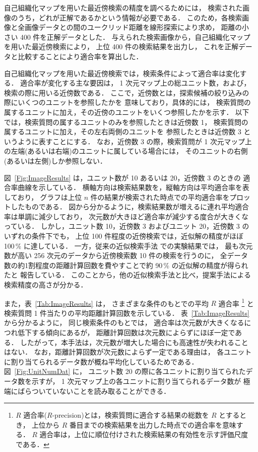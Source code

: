 自己組織化マップを用いた最近傍検索の精度を調べるためには，
検索された画像のうち，どれが正解であるかという情報が必要である．
このため，各検索画像と全画像データとの間のユークリッド距離を線形探索により求め，
距離の小さい 400 件を正解データとした．
与えられた検索画像から，自己組織化マップを用いた最近傍検索により，
上位 400 件の検索結果を出力し，
これを正解データと比較することにより適合率を算出した．

自己組織化マップを用いた最近傍検索では，検索条件によって適合率は変化する．
適合率が変化する主な要因は，
1 次元マップ上の総ユニット数，および，検索の際に用いる近傍数である．
ここで，近傍数とは，探索候補の絞り込みの際にいくつのユニットを参照したかを
意味しており，具体的には，
検索質問の属するユニットに加え，その近傍のユニットをいくつ参照したかを示す．
以下では，検索質問の属するユニットのみを参照したときは近傍数 1，
検索質問の属するユニットに加え，その左右両側のユニットを
参照したときは近傍数 3 というように表すことにする．
なお，近傍数 3 の際，検索質問が 1 次元マップ上の左端(あるいは右端)のユニットに属している場合には，
そのユニットの右側(あるいは左側)しか参照しない．

図~\ref{Fig:ImageResults} は，ユニット数が 10 あるいは 20，近傍数 3 のときの
適合率曲線を示している．
横軸方向は検索結果数を，縦軸方向は平均適合率を表しており，
グラフは上位 $n$ 件の結果が検索された時点での平均適合率をプロットしたものである．
図から分かるように，検索結果数が増えるに連れ平均適合率は単調に減少しており，
次元数が大きほど適合率が減少する度合が大きくなっている．
しかし，ユニット数 10，近傍数 3 およびユニット 20，近傍数 3 のいずれの条件下でも，
上位 100 件程度の近傍検索では，近似解の精度がほぼ 100\,\% に達している．
一方，従来の近似検索手法 \cite{Gionis99,Shepherd99} での実験結果では，
最も次元数が高い 256 次元のデータから近傍検索数 10 件の検索を行うのに，
全データ数の約1割程度の距離計算回数を費やすことで約 90\,\% の近似解の精度が得られたと
報告している．
このことから，他の近似検索手法と比べ，提案手法による検索精度の高さが分かる．

また，表~\ref{Tab:ImageResults} は，
さまざまな条件のもとでの平均 $R$ 適合率
\footnote{
$R$ 適合率($R$-precision)とは，検索質問に適合する結果の総数を $R$ とするとき，
上位から $R$ 番目までの検索結果を出力した時点での適合率を意味する\cite{IRbook}．
$R$ 適合率は，上位に順位付けされた検索結果の有効性を示す評価尺度である．
}
と検索質問 1 件当たりの平均距離計算回数を示している．
表~\ref{Tab:ImageResults} から分かるように，
同じ検索条件のもとでは，
適合率は次元数が大きくなるにつれ低下する傾向にあるが，
距離計算回数は次元数によらずにほぼ一定である．
したがって，本手法は，次元数が増大した場合にも高速性が失われることはない．
なお，距離計算回数が次元数によらず一定である理由は，
各ユニットに割り当てられるデータ数が概ね平均化しているためである．
図~\ref{Fig:UnitNumDat} に，
ユニット数 20 の際に各ユニットに割り当てられたデータ数を示すが，
1 次元マップ上の各ユニットに割り当てられるデータ数が
極端にばらついていないことを読み取ることができる．

